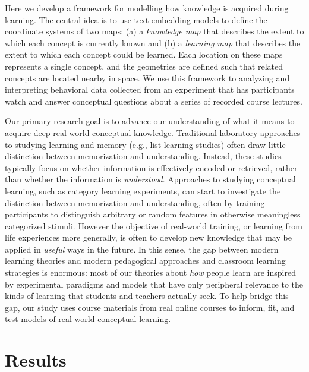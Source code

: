 \documentclass[10pt]{article}
\begin{document}
Here we develop a framework for modelling how knowledge is acquired during
learning. The central idea is to use text embedding models to define the
coordinate systems of two maps: (a) a \textit{knowledge map} that describes the
extent to which each concept is currently known and (b) a \textit{learning map}
that describes the extent to which each concept could be learned. Each location
on these maps represents a single concept, and the geometries are defined such
that related concepts are located nearby in space. We use this framework to
analyzing and interpreting behavioral data collected from an experiment that
has participants watch and answer conceptual questions about a series of
recorded course lectures.

Our primary research goal is to advance our understanding of what it means to
acquire deep real-world conceptual knowledge. Traditional laboratory approaches
to studying learning and memory (e.g., list learning studies) often draw little
distinction between memorization and understanding. Instead, these studies
typically focus on whether information is effectively encoded or retrieved,
rather than whether the information is \textit{understood}. Approaches to
studying conceptual learning, such as category learning experiments, can start
to investigate the distinction between memorization and understanding, often by
training participants to distinguish arbitrary or random features in otherwise
meaningless categorized stimuli. However the objective of real-world training,
or learning from life experiences more generally, is often to develop new
knowledge that may be applied in \textit{useful} ways in the future. In this
sense, the gap between modern learning theories and modern pedagogical
approaches and classroom learning strategies is enormous: most of our theories
about \textit{how} people learn are inspired by experimental paradigms and
models that have only peripheral relevance to the kinds of learning that
students and teachers actually seek. To help bridge this gap, our study uses
course materials from real online courses to inform, fit, and test models of
real-world conceptual learning.

\section*{Results}

\end{document}
